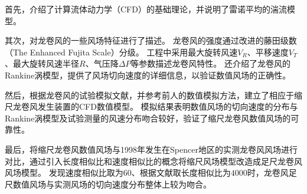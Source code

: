 首先，介绍了计算流体动力学（CFD）的基础理论，并说明了雷诺平均的湍流模型。

其次，对龙卷风的一些风场特征进行了描述。
龙卷风的强度通过改进的藤田级数（The Enhanced Fujita Scale）分级。
工程中采用最大旋转风速$V_R$、平移速度$V_T$、最大旋转风速半径$R$、气压降$\Delta P$等参数描述龙卷风特性。
还介绍了龙卷风的Rankine涡模型，提供了风场切向速度的详细信息，以验证数值风场的正确性。

然后，根据龙卷风的试验模拟文献，并参考前人的数值模拟方法，建立了相应于缩尺龙卷风发生装置的CFD数值模型。
模拟结果表明数值风场的切向速度的分布与Rankine涡模型及试验测量的风速分布吻合较好，验证了缩尺龙卷风数值风场的可靠性。

最后，将缩尺龙卷风数值风场与1998年发生在Spencer地区的实测龙卷风风场进行对比，通过引入长度相似比和速度相似比的概念将缩尺风场模型改造成足尺龙卷风风场模型。
发现速度相似比取为$60$、根据文献取长度相似比为$4000$时，龙卷风足尺数值风场与实测风场的切向速度分布整体上较为吻合。


